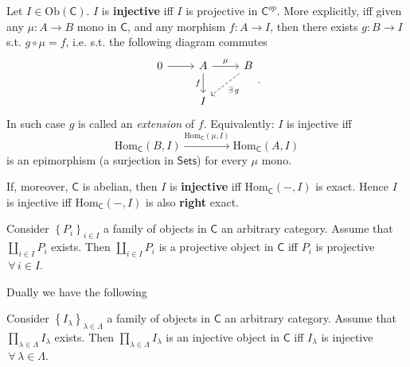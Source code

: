 \begin{defn}
	Let $I \in \mathrm{Ob} \left(\mathsf{C}\right)$.
	$I$ is \textbf{injective} iff $I$ is projective in $\mathsf{C}^{op}$.
	More explicitly, iff given any $\mu: A \to B$ mono in $\mathsf{C}$,
	and any morphism $f: A \to I$, then there exists $g: B \to I$ s.t. $g \circ \mu = f$,
	i.e. s.t. the following diagram commutes
	\begin{equation}
	\begin{tikzcd}
		0 \arrow[r, "", rightarrow]  &
		A \arrow[r, "\mu", rightarrow] \arrow[d, "f"', rightarrow] &
		B \arrow[dl, "\exists\, g", dashrightarrow] \\
		& I &
	\end{tikzcd}
	.\end{equation} 
	In such case $g$ is called an \textit{extension} of $f$.\newline
	Equivalently:
	$I$ is injective iff
	\begin{equation}
	\mathrm{Hom}_{\mathsf{C}} \left( B, I \right) \xrightarrow{\mathrm{Hom}_{\mathsf{C}} \left( \mu, I \right)} 
	\mathrm{Hom}_{\mathsf{C}} \left( A, I \right)
	\end{equation} 
	is an epimorphism (a surjection in $\mathsf{Sets}$) for every $\mu$ mono.
\end{defn}

\begin{rem}
	If, moreover, $\mathsf{C}$ is abelian, then
	$I$ is \textbf{injective} iff $\mathrm{Hom}_{\mathsf{C}} \left( -, I \right)$ is exact.
	Hence $I$ is injective iff $\mathrm{Hom}_{\mathsf{C}} \left( -, I\right)$ is also \textbf{right} exact.
\end{rem}

\begin{prop}
	Consider $\left\{ P_i \right\}_{i \in I}$ a family of objects in $\mathsf{C}$ an arbitrary category.
	Assume that $\coprod_{i \in I} P_i$ exists.
	Then $\coprod_{i \in I} P_i$ is a projective object in $\mathsf{C}$ 
	iff $P_i$ is projective $\,\forall\, i \in I$.
\end{prop} 

Dually we have the following

\begin{prop}
	Consider $\left\{ I_\lambda \right\}_{\lambda \in \Lambda}$ a family of objects in $\mathsf{C}$ an arbitrary category.
	Assume that $\prod_{\lambda \in \Lambda} I_\lambda$ exists.
	Then $\prod_{\lambda \in \Lambda} I_\lambda$ is an injective object in $\mathsf{C}$ 
	iff $I_\lambda$ is injective $\,\forall\, \lambda \in \Lambda$.
\end{prop} 

